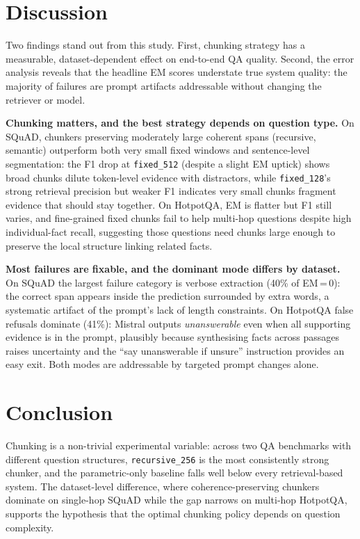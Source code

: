 \documentclass[11pt]{article}
\begin{document}
\section{Discussion}

Two findings stand out from this study. First, chunking strategy has a measurable,
dataset-dependent effect on end-to-end QA quality. Second, the error analysis reveals
that the headline EM scores understate true system quality: the majority of failures
are prompt artifacts addressable without changing the retriever or model.

\textbf{Chunking matters, and the best strategy depends on question type.} On SQuAD,
chunkers preserving moderately large coherent spans (recursive, semantic) outperform
both very small fixed windows and sentence-level segmentation: the F1 drop at
\texttt{fixed\_512} (despite a slight EM uptick) shows broad chunks dilute token-level
evidence with distractors, while \texttt{fixed\_128}'s strong retrieval precision but
weaker F1 indicates very small chunks fragment evidence that should stay together. On
HotpotQA, EM is flatter but F1 still varies, and fine-grained fixed chunks fail to help
multi-hop questions despite high individual-fact recall, suggesting those questions need
chunks large enough to preserve the local structure linking related facts.

\textbf{Most failures are fixable, and the dominant mode differs by dataset.} On SQuAD
the largest failure category is verbose extraction (40\% of EM\,=\,0): the correct span
appears inside the prediction surrounded by extra words, a systematic artifact of the
prompt's lack of length constraints. On HotpotQA false refusals dominate (41\%):
Mistral outputs \textit{unanswerable} even when all supporting evidence is in the
prompt, plausibly because synthesising facts across passages raises uncertainty and the
``say unanswerable if unsure'' instruction provides an easy exit. Both modes are
addressable by targeted prompt changes alone.

\section{Conclusion}

Chunking is a non-trivial experimental variable: across two QA benchmarks with different
question structures, \texttt{recursive\_256} is the most consistently strong chunker,
and the parametric-only baseline falls well below every retrieval-based system.
The dataset-level difference, where coherence-preserving chunkers dominate on single-hop
SQuAD while the gap narrows on multi-hop HotpotQA, supports the hypothesis that the
optimal chunking policy depends on question complexity.
\end{document}
